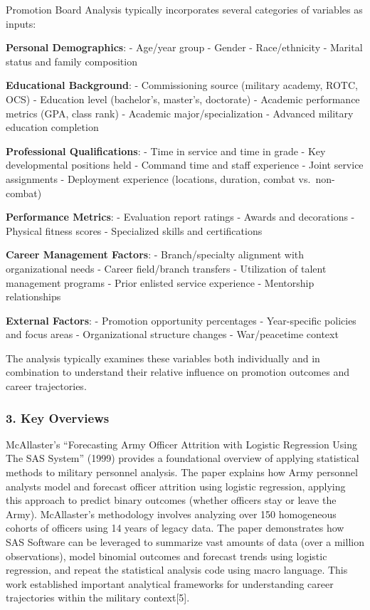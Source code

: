 \documentclass[./main.tex]{subfiles}
\begin{document}
Promotion Board Analysis typically incorporates several categories of
variables as inputs:

\textbf{Personal Demographics}: - Age/year group - Gender -
Race/ethnicity - Marital status and family composition

\textbf{Educational Background}: - Commissioning source (military
academy, ROTC, OCS) - Education level (bachelor's, master's, doctorate)
- Academic performance metrics (GPA, class rank) - Academic
major/specialization - Advanced military education completion

\textbf{Professional Qualifications}: - Time in service and time in
grade - Key developmental positions held - Command time and staff
experience - Joint service assignments - Deployment experience
(locations, duration, combat vs.~non-combat)

\textbf{Performance Metrics}: - Evaluation report ratings - Awards and
decorations - Physical fitness scores - Specialized skills and
certifications

\textbf{Career Management Factors}: - Branch/specialty alignment with
organizational needs - Career field/branch transfers - Utilization of
talent management programs - Prior enlisted service experience -
Mentorship relationships

\textbf{External Factors}: - Promotion opportunity percentages -
Year-specific policies and focus areas - Organizational structure
changes - War/peacetime context

The analysis typically examines these variables both individually and in
combination to understand their relative influence on promotion outcomes
and career trajectories.

\subsubsection{3. Key Overviews}\label{key-overviews}

McAllaster's ``Forecasting Army Officer Attrition with Logistic
Regression Using The SAS System'' (1999) provides a foundational
overview of applying statistical methods to military personnel analysis.
The paper explains how Army personnel analysts model and forecast
officer attrition using logistic regression, applying this approach to
predict binary outcomes (whether officers stay or leave the Army).
McAllaster's methodology involves analyzing over 150 homogeneous cohorts
of officers using 14 years of legacy data. The paper demonstrates how
SAS Software can be leveraged to summarize vast amounts of data (over a
million observations), model binomial outcomes and forecast trends using
logistic regression, and repeat the statistical analysis code using
macro language. This work established important analytical frameworks
for understanding career trajectories within the military
context{[}5{]}.
\end{document}
